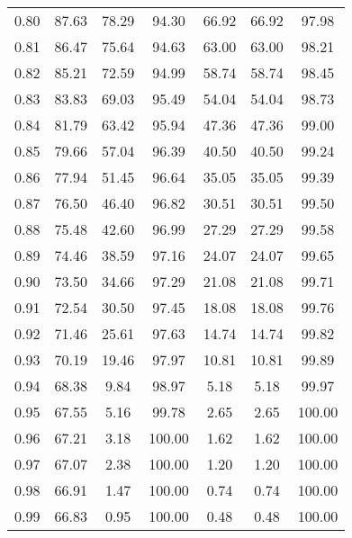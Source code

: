 \begin{tabular}{|c|c|c|c|c|c|c|}
      0.80 &     87.63 &     78.29 &      94.30 &   66.92 &      66.92 &         97.98 \\
      0.81 &     86.47 &     75.64 &      94.63 &   63.00 &      63.00 &         98.21 \\
      0.82 &     85.21 &     72.59 &      94.99 &   58.74 &      58.74 &         98.45 \\
      0.83 &     83.83 &     69.03 &      95.49 &   54.04 &      54.04 &         98.73 \\
      0.84 &     81.79 &     63.42 &      95.94 &   47.36 &      47.36 &         99.00 \\
      0.85 &     79.66 &     57.04 &      96.39 &   40.50 &      40.50 &         99.24 \\
      0.86 &     77.94 &     51.45 &      96.64 &   35.05 &      35.05 &         99.39 \\
      0.87 &     76.50 &     46.40 &      96.82 &   30.51 &      30.51 &         99.50 \\
      0.88 &     75.48 &     42.60 &      96.99 &   27.29 &      27.29 &         99.58 \\
      0.89 &     74.46 &     38.59 &      97.16 &   24.07 &      24.07 &         99.65 \\
      0.90 &     73.50 &     34.66 &      97.29 &   21.08 &      21.08 &         99.71 \\
      0.91 &     72.54 &     30.50 &      97.45 &   18.08 &      18.08 &         99.76 \\
      0.92 &     71.46 &     25.61 &      97.63 &   14.74 &      14.74 &         99.82 \\
      0.93 &     70.19 &     19.46 &      97.97 &   10.81 &      10.81 &         99.89 \\
      0.94 &     68.38 &      9.84 &      98.97 &    5.18 &       5.18 &         99.97 \\
      0.95 &     67.55 &      5.16 &      99.78 &    2.65 &       2.65 &        100.00 \\
      0.96 &     67.21 &      3.18 &     100.00 &    1.62 &       1.62 &        100.00 \\
      0.97 &     67.07 &      2.38 &     100.00 &    1.20 &       1.20 &        100.00 \\
      0.98 &     66.91 &      1.47 &     100.00 &    0.74 &       0.74 &        100.00 \\
      0.99 &     66.83 &      0.95 &     100.00 &    0.48 &       0.48 &        100.00 \\
\bottomrule
\end{tabular}
